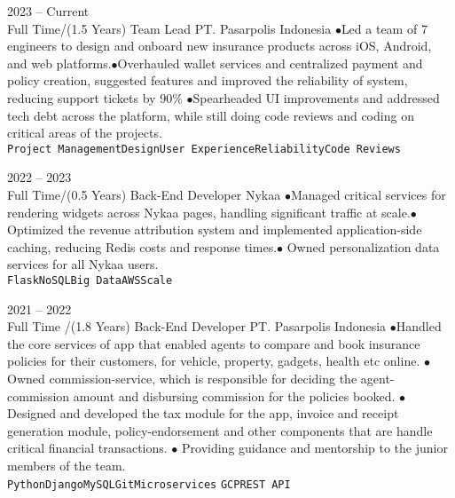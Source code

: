 \documentclass[9pt]{developercv} %
\begin{document}

\begin{entrylist}
	
	\entry
	{2023 -- Current\\\footnotesize{Full Time/(1.5 Years)}}
	{Team Lead}
	{PT. Pasarpolis Indonesia}
	{$\bullet$Led a team of 7 engineers to design and onboard new insurance products across iOS, Android, and web platforms.$\bullet$Overhauled wallet services and centralized payment and policy creation, suggested features and improved the reliability of system, reducing support tickets by 90\% $\bullet$Spearheaded UI improvements and addressed tech debt across the platform, while still doing code reviews and  coding on critical areas of the projects.\\ \texttt{Project Management}\slashsep\texttt{Design}\slashsep\texttt{User Experience}\slashsep\texttt{Reliability}\slashsep\texttt{Code Reviews}}

		\entry
	{2022 -- 2023\\\footnotesize{Full Time/(0.5 Years)}}
	{Back-End Developer}
	{Nykaa}
	{$\bullet$Managed critical services for rendering widgets across Nykaa pages, handling significant traffic at scale.$\bullet$Optimized the revenue attribution system and implemented application-side caching, reducing Redis costs and response times.$\bullet$ Owned personalization data services for all Nykaa users.\\ \texttt{Flask}\slashsep\texttt{NoSQL}\slashsep\texttt{Big Data}\slashsep\texttt{AWS}\slashsep\texttt{Scale}}

		\entry
	{2021 -- 2022\\\footnotesize{Full Time /(1.8 Years)}}
	{Back-End Developer}
	{PT. Pasarpolis Indonesia}
	{$\bullet$Handled the core services of app that enabled agents to compare and book insurance policies for their customers, for vehicle, property, gadgets, health  etc online. $\bullet$Owned commission-service, which is responsible for deciding the agent-commission amount and disbursing commission for the policies booked. $\bullet$ Designed and developed the tax module for the app, invoice and receipt generation module, policy-endorsement and other components that are handle critical financial transactions. $\bullet$ Providing guidance and mentorship to the junior members of the team.\\ \texttt{Python}\slashsep\texttt{Django}\slashsep\texttt{MySQL}\slashsep\texttt{Git}\slashsep\texttt{Microservices} \slashsep\texttt{GCP}\slashsep\texttt{REST API}}
	

\end{entrylist}
\end{document}
